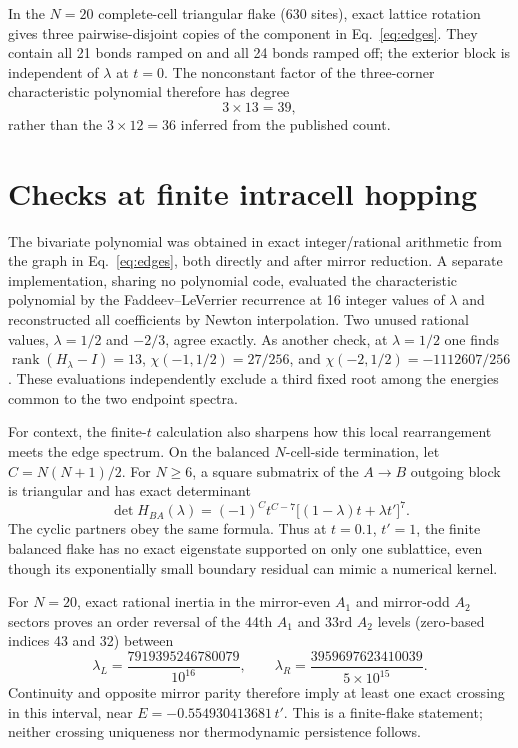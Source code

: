 \documentclass[aps,prb,reprint,amsmath,amssymb,longbibliography]{revtex4-2}
\begin{document}
In the $N=20$ complete-cell triangular flake (630 sites), exact lattice
rotation gives three pairwise-disjoint copies of the component in
Eq.~\eqref{eq:edges}.  They contain all 21 bonds ramped on and all 24 bonds
ramped off; the exterior block is independent of $\lambda$ at $t=0$.
The nonconstant factor of the three-corner characteristic polynomial
therefore has degree
\begin{equation}
 3\times13=39,
\end{equation}
rather than the $3\times12=36$ inferred from the published count.

\section{Checks at finite intracell hopping}

The bivariate polynomial was obtained in exact integer/rational arithmetic
from the graph in Eq.~\eqref{eq:edges}, both directly and after mirror
reduction.  A separate implementation, sharing no polynomial code, evaluated
the characteristic polynomial by the Faddeev--LeVerrier recurrence at 16
integer values of $\lambda$ and reconstructed all coefficients by Newton
interpolation.  Two unused rational values, $\lambda=1/2$ and $-2/3$, agree
exactly.  As another check, at $\lambda=1/2$ one finds
$\operatorname{rank}(H_\lambda-I)=13$,
$\chi(-1,1/2)=27/256$, and
$\chi(-2,1/2)=-1112607/256$.  These evaluations independently exclude a
third fixed root among the energies common to the two endpoint spectra.

For context, the finite-$t$ calculation also sharpens how this local
rearrangement meets the edge spectrum.  On the balanced $N$-cell-side
termination, let $C=N(N+1)/2$.  For $N\geq6$, a square submatrix of the
$A\to B$ outgoing block is triangular and has exact determinant
\begin{equation}
 \det H_{BA}(\lambda)=(-1)^C t^{C-7}
 \big[(1-\lambda)t+\lambda t'\big]^7.
 \label{eq:minor}
\end{equation}
The cyclic partners obey the same formula.  Thus at $t=0.1$, $t'=1$, the
finite balanced flake has no exact eigenstate supported on only one
sublattice, even though its exponentially small boundary residual can mimic
a numerical kernel.

For $N=20$, exact rational inertia in the mirror-even $A_1$ and mirror-odd
$A_2$ sectors proves an order reversal of the 44th $A_1$ and 33rd $A_2$
levels (zero-based indices 43 and 32) between
\begin{equation}
 \lambda_L=\frac{7919395246780079}{10^{16}},\qquad
 \lambda_R=\frac{3959697623410039}{5\times10^{15}}.
 \label{eq:crossingbracket}
\end{equation}
Continuity and opposite mirror parity therefore imply at least one exact
crossing in this interval, near
$E=-0.554930413681\,t'$.  This is a finite-flake statement; neither crossing
uniqueness nor thermodynamic persistence follows.
\end{document}
